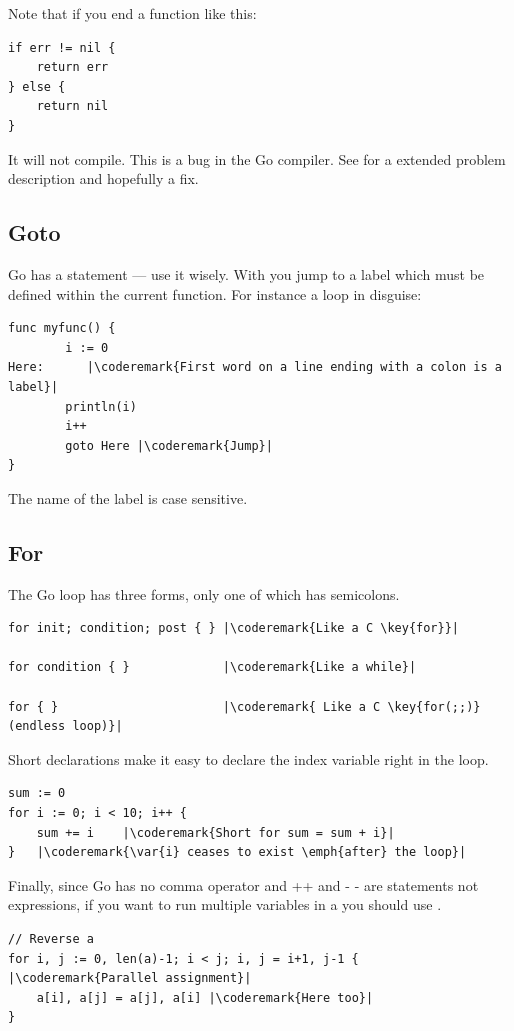 \begin{lbar}
Note that if you end a function like this:
\begin{lstlisting}
if err != nil {
    return err
} else {
    return nil
}
\end{lstlisting}
It will not compile. This is a bug in the Go compiler. See
\cite{go_issue_65} for a extended problem description and
hopefully a fix.
\end{lbar}

\subsection{Goto}
Go has a  statement --- use it wisely. With 
you jump to a  label which must be defined within the current function.
For instance a loop in disguise:
\begin{lstlisting}
func myfunc() {
        i := 0                                                                                      
Here:	   |\coderemark{First word on a line ending with a colon is a label}|
        println(i)
        i++ 
        goto Here |\coderemark{Jump}|
}
\end{lstlisting}
The name of the label is case sensitive.

\subsection{For}
\label{sec:for}
The Go  loop has three forms, only one of
which has semicolons.
\begin{lstlisting}
for init; condition; post { } |\coderemark{Like a C \key{for}}|

for condition { }             |\coderemark{Like a while}|

for { }                       |\coderemark{ Like a C \key{for(;;)} (endless loop)}|
\end{lstlisting}
Short declarations make it easy to declare the index variable right in the loop.
\begin{lstlisting}
sum := 0
for i := 0; i < 10; i++ {
    sum += i	|\coderemark{Short for sum = sum + i}|
}   |\coderemark{\var{i} ceases to exist \emph{after} the loop}|
\end{lstlisting}
Finally, since Go has no comma operator and ++ and - - are statements not
expressions, if you want to run multiple variables in a  you should
use .
\begin{lstlisting}
// Reverse a
for i, j := 0, len(a)-1; i < j; i, j = i+1, j-1 { |\coderemark{Parallel assignment}|
    a[i], a[j] = a[j], a[i] |\coderemark{Here too}|
}
\end{lstlisting}

